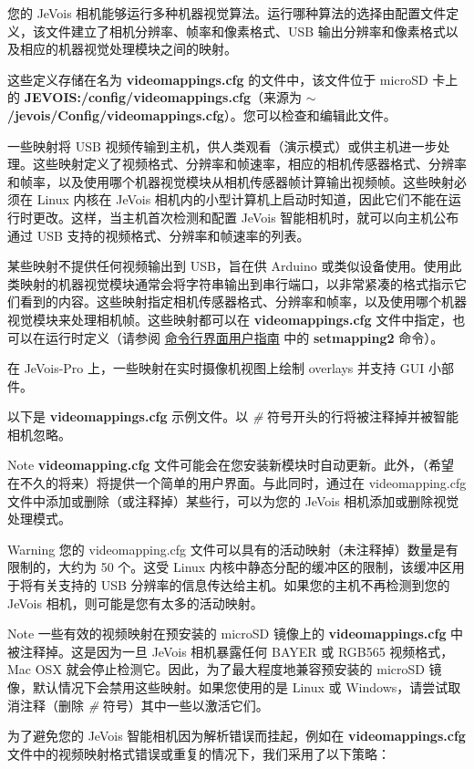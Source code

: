 您的 Je\+Vois 相机能够运行多种机器视觉算法。运行哪种算法的选择由配置文件定义，该文件建立了相机分辨率、帧率和像素格式、\+U\+SB 输出分辨率和像素格式以及相应的机器视觉处理模块之间的映射。

这些定义存储在名为 {\bfseries{videomappings.\+cfg}} 的文件中，该文件位于 micro\+SD 卡上的 {\bfseries{J\+E\+V\+O\+IS\+:/config/videomappings.cfg}}（来源为 {\bfseries{$\sim$/jevois/\+Config/videomappings.cfg}}）。您可以检查和编辑此文件。

一些映射将 U\+SB 视频传输到主机，供人类观看（演示模式）或供主机进一步处理。这些映射定义了视频格式、分辨率和帧速率，相应的相机传感器格式、分辨率和帧率，以及使用哪个机器视觉模块从相机传感器帧计算输出视频帧。这些映射必须在 Linux 内核在 Je\+Vois 相机内的小型计算机上启动时知道，因此它们不能在运行时更改。这样，当主机首次检测和配置 Je\+Vois 智能相机时，就可以向主机公布通过 U\+SB 支持的视频格式、分辨率和帧速率的列表。

某些映射不提供任何视频输出到 U\+S\+B，旨在供 Arduino 或类似设备使用。使用此类映射的机器视觉模块通常会将字符串输出到串行端口，以非常紧凑的格式指示它们看到的内容。这些映射指定相机传感器格式、分辨率和帧率，以及使用哪个机器视觉模块来处理相机帧。这些映射都可以在 {\bfseries{videomappings.\+cfg}} 文件中指定，也可以在运行时定义（请参阅 \mbox{\hyperlink{UserCli}{命令行界面用户指南}} 中的 {\bfseries{setmapping2}} 命令）。

在 Je\+Vois-\/\+Pro 上，一些映射在实时摄像机视图上绘制 overlays 并支持 G\+UI 小部件。

以下是 {\bfseries{videomappings.\+cfg}} 示例文件。以 {\itshape \#} 符号开头的行将被注释掉并被智能相机忽略。

\begin{DoxyNote}{Note}
{\bfseries{videomapping.\+cfg}} 文件可能会在您安装新模块时自动更新。此外，（希望在不久的将来）将提供一个简单的用户界面。与此同时，通过在 videomapping.\+cfg 文件中添加或删除（或注释掉）某些行，可以为您的 Je\+Vois 相机添加或删除视觉处理模式。
\end{DoxyNote}
\begin{DoxyWarning}{Warning}
您的 videomapping.\+cfg 文件可以具有的活动映射（未注释掉）数量是有限制的，大约为 50 个。这受 Linux 内核中静态分配的缓冲区的限制，该缓冲区用于将有关支持的 U\+SB 分辨率的信息传达给主机。如果您的主机不再检测到您的 Je\+Vois 相机，则可能是您有太多的活动映射。
\end{DoxyWarning}
\begin{DoxyNote}{Note}
一些有效的视频映射在预安装的 micro\+SD 镜像上的 {\bfseries{videomappings.\+cfg}} 中被注释掉。这是因为一旦 Je\+Vois 相机暴露任何 B\+A\+Y\+ER 或 R\+G\+B565 视频格式，\+Mac O\+SX 就会停止检测它。因此，为了最大程度地兼容预安装的 micro\+SD 镜像，默认情况下会禁用这些映射。如果您使用的是 Linux 或 Windows，请尝试取消注释（删除 {\itshape \#} 符号）其中一些以激活它们。
\end{DoxyNote}
为了避免您的 Je\+Vois 智能相机因为解析错误而挂起，例如在 {\bfseries{videomappings.\+cfg}} 文件中的视频映射格式错误或重复的情况下，我们采用了以下策略：


